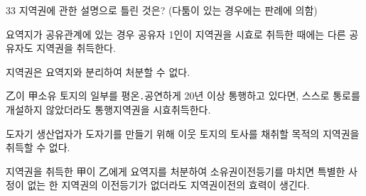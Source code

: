 \begin{question}{33}
지역권에 관한 설명으로 틀린 것은? (다툼이 있는 경우에는 판례에 의함)
\begin{choices}
  \item 요역지가 공유관계에 있는 경우 공유자 1인이 지역권을 시효로 취득한 때에는 다른 공유자도 지역권을 취득한다.
  \item 지역권은 요역지와 분리하여 처분할 수 없다.
  \item 乙이 甲소유 토지의 일부를 평온․공연하게 20년 이상 통행하고 있다면, 스스로 통로를 개설하지 않았더라도 통행지역권을 시효취득한다.
  \item 도자기 생산업자가 도자기를 만들기 위해 이웃 토지의 토사를 채취할 목적의 지역권을 취득할 수 없다.
  \item 지역권을 취득한 甲이 乙에게 요역지를 처분하여 소유권이전등기를 마치면 특별한 사정이 없는 한 지역권의 이전등기가 없더라도 지역권이전의 효력이 생긴다.
\end{choices}
\end{question}
